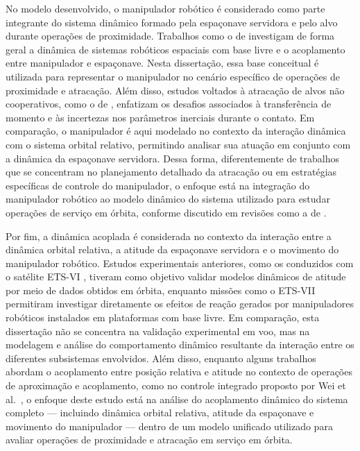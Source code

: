 No modelo desenvolvido, o manipulador robótico é considerado como parte integrante do sistema dinâmico formado pela espaçonave servidora e pelo alvo durante operações de proximidade.
Trabalhos como o de \cite{papadopoulos1994free} investigam de forma geral a dinâmica de sistemas robóticos espaciais com base livre e o acoplamento entre manipulador e espaçonave.
Nesta dissertação, essa base conceitual é utilizada para representar o manipulador no cenário específico de operações de proximidade e atracação.
Além disso, estudos voltados à atracação de alvos não cooperativos, como o de \cite{nishida2011strategy}, enfatizam os desafios associados à transferência de momento e às incertezas nos parâmetros inerciais durante o contato.
Em comparação, o manipulador é aqui modelado no contexto da interação dinâmica com o sistema orbital relativo, permitindo analisar sua atuação em conjunto com a dinâmica da espaçonave servidora.
Dessa forma, diferentemente de trabalhos que se concentram no planejamento detalhado da atracação ou em estratégias específicas de controle do manipulador, o enfoque está na integração do manipulador robótico ao modelo dinâmico do sistema utilizado para estudar operações de serviço em órbita, conforme discutido em revisões como a de \cite{flores2014review}.

Por fim, a dinâmica acoplada é considerada no contexto da interação entre a dinâmica orbital relativa, a atitude da espaçonave servidora e o movimento do manipulador robótico.
Estudos experimentais anteriores, como os conduzidos com o satélite ETS-VI \cite{adachi1999}, tiveram como objetivo validar modelos dinâmicos de atitude por meio de dados obtidos em órbita, enquanto missões como o ETS-VII \cite{yoshida2003} permitiram investigar diretamente os efeitos de reação gerados por manipuladores robóticos instalados em plataformas com base livre.
Em comparação, esta dissertação não se concentra na validação experimental em voo, mas na modelagem e análise do comportamento dinâmico resultante da interação entre os diferentes subsistemas envolvidos.
Além disso, enquanto alguns trabalhos abordam o acoplamento entre posição relativa e atitude no contexto de operações de aproximação e acoplamento, como no controle integrado proposto por Wei et al.~\cite{wei2011}, o enfoque deste estudo está na análise do acoplamento dinâmico do sistema completo — incluindo dinâmica orbital relativa, atitude da espaçonave e movimento do manipulador — dentro de um modelo unificado utilizado para avaliar operações de proximidade e atracação em serviço em órbita.